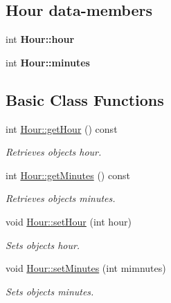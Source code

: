 \subsection*{Hour data-\/members}
\begin{DoxyCompactItemize}
\item 
\mbox{\label{group___hour_gac9509fa4f6fe9d9c6dc5794c2bd634ea}} 
int {\bfseries Hour\+::hour}
\item 
\mbox{\label{group___hour_ga9e4fb5ad4ded246b72c909981860cefe}} 
int {\bfseries Hour\+::minutes}
\end{DoxyCompactItemize}
\subsection*{Basic Class Functions}
\begin{DoxyCompactItemize}
\item 
int \hyperlink{group___hour_ga44859e9acda4578bc3cfcad5d2f25585}{Hour\+::get\+Hour} () const
\begin{DoxyCompactList}\small\item\em Retrieves object\textquotesingle{}s hour. \end{DoxyCompactList}\item 
int \hyperlink{group___hour_gaccf1de7229b52b59d2119e9802fa3eee}{Hour\+::get\+Minutes} () const
\begin{DoxyCompactList}\small\item\em Retrieves object\textquotesingle{}s minutes. \end{DoxyCompactList}\item 
void \hyperlink{group___hour_ga62d4e3da6eeefecab589a63160493835}{Hour\+::set\+Hour} (int hour)
\begin{DoxyCompactList}\small\item\em Sets object\textquotesingle{}s hour. \end{DoxyCompactList}\item 
void \hyperlink{group___hour_gab3606a7c5dd8679a44e79536a491923e}{Hour\+::set\+Minutes} (int mimnutes)
\begin{DoxyCompactList}\small\item\em Sets object\textquotesingle{}s minutes. \end{DoxyCompactList}\end{DoxyCompactItemize}
